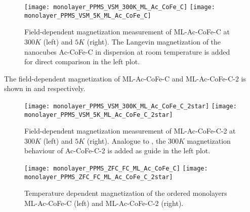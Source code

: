 \documentclass[\main/dresen_thesis.tex]{subfiles}
\begin{document}
  \begin{figure}[tb]
    \centering
    \texttt{[image: monolayer\_PPMS\_VSM\_300K\_ML\_Ac\_CoFe\_C]}
    \texttt{[image: monolayer\_PPMS\_VSM\_5K\_ML\_Ac\_CoFe\_C]}
    \caption{\label{fig:monolayer:magneticStructure:MLAcCoFeC}Field-dependent magnetization measurement of ML-Ac-CoFe-C at $300 \unit{K}$ (left) and $5 \unit{K}$ (right). The Langevin magnetization of the nanocubes Ac-CoFe-C in dispersion at room temperature is added for direct comparison in the left plot.}
  \end{figure}
  The field-dependent magnetization of ML-Ac-CoFe-C and ML-Ac-CoFe-C-2 is shown in  and  respectively.

  
  \begin{figure}[tb]
    \centering
    \texttt{[image: monolayer\_PPMS\_VSM\_300K\_ML\_Ac\_CoFe\_C\_2star]}
    \texttt{[image: monolayer\_PPMS\_VSM\_5K\_ML\_Ac\_CoFe\_C\_2star]}
    \caption{\label{fig:monolayer:magneticStructure:MLAcCoFeC2}Field-dependent magnetization measurement of ML-Ac-CoFe-C-2 at $300 \unit{K}$ (left) and $5 \unit{K}$ (right). Analogue to , the $300 \unit{K}$ magnetization behaviour of Ac-CoFe-C-2 is added as guide in the left plot.}
  \end{figure}

  \begin{figure}[tb]
    \centering
    \texttt{[image: monolayer\_PPMS\_ZFC\_FC\_ML\_Ac\_CoFe\_C]}
    \texttt{[image: monolayer\_PPMS\_ZFC\_FC\_ML\_Ac\_CoFe\_C\_2star]}
    \caption{\label{fig:monolayer:magneticStructure:ppmsZFCFC}Temperature dependent magnetization of the ordered monolayers ML-Ac-CoFe-C (left) and ML-Ac-CoFe-C-2 (right).}
  \end{figure}
\end{document}
